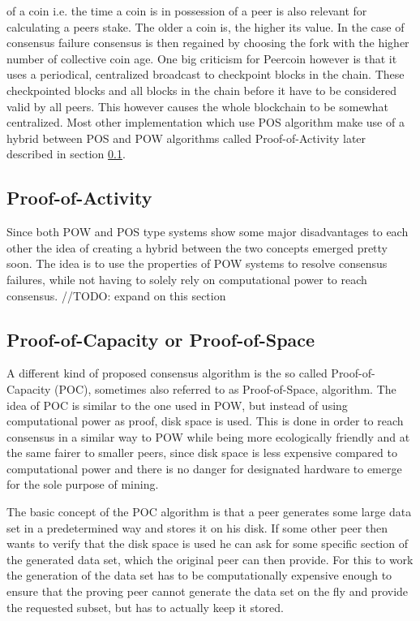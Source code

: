 of a coin i.e. the time a coin is in possession of a peer is also relevant for calculating a peers stake. The older a coin is, the higher its value. In the case of consensus failure consensus is then
regained by choosing the fork with the higher number of collective coin age.\cite{url:peercoin} One big criticism for Peercoin however is that it uses a periodical, centralized broadcast to checkpoint blocks in the chain.
These checkpointed blocks and all blocks in the chain before it have to be considered valid by all peers. This however causes the whole blockchain to be somewhat centralized.
Most other implementation which use POS algorithm make use of a hybrid between POS and POW algorithms called Proof-of-Activity later described in section \ref{poa}.

\subsection{Proof-of-Activity} \label{poa}

Since both POW and POS type systems show some major disadvantages to each other the idea of creating a hybrid between the two concepts emerged pretty soon. The idea is to use the properties of POW
systems to resolve consensus failures, while not having to solely rely on computational power to reach consensus.
//TODO: expand on this section

\subsection{Proof-of-Capacity or Proof-of-Space}

A different kind of proposed consensus algorithm is the so called Proof-of-Capacity (POC), sometimes also referred to as Proof-of-Space, algorithm. The idea of POC is similar to the one used in POW, but
instead of using computational power as proof, disk space is used. This is done in order to reach consensus in a similar way to POW while being more ecologically friendly and at the same
fairer to smaller peers, since disk space is less expensive compared to computational power and there is no danger for designated hardware to emerge for the sole purpose of mining.\par
The basic concept of the POC algorithm is that a peer generates some large data set in a predetermined way and stores it on his disk. If some other peer then wants to verify that the disk space is used
he can ask for some specific section of the generated data set, which the original peer can then provide. For this to work the generation of the data set has to be computationally expensive enough
to ensure that the proving peer cannot generate the data set on the fly and provide the requested subset, but has to actually keep it stored.\cite{url:poc}

